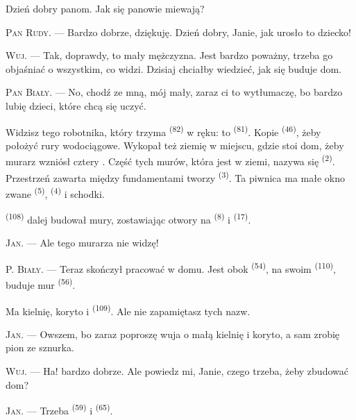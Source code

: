 Dzień dobry panom. Jak się panowie miewają?

\textsc{Pan Rudy}. --- Bardzo dobrze, dziękuję. Dzień dobry, Janie, jak urosło to
dziecko!

\textsc{Wuj}. --- Tak, doprawdy, to mały mężczyzna. Jest bardzo poważny, trzeba go
objaśniać o wszystkim, co widzi. Dzisiaj chciałby wiedzieć, jak się buduje dom.

\VUsaut{3.0mm}

\textsc{Pan Biały}. --- No, chodź ze mną, mój mały, zaraz ci to wytłumaczę, bo bardzo
lubię dzieci, które chcą się uczyć.

Widzisz tego robotnika, który trzyma  \textsuperscript{(82)} w ręku: to
 \textsuperscript{(81)}. Kopie  \textsuperscript{(46)}, żeby
położyć rury wodociągowe. Wykopał też ziemię w miejscu, gdzie stoi dom, żeby murarz
wzniósł cztery . Część tych murów, która jest w ziemi, nazywa się
 \textsuperscript{(2)}. Przestrzeń zawarta między fundamentami
tworzy  \textsuperscript{(3)}. Ta piwnica ma małe okno zwane
 \textsuperscript{(5)}, 
\textsuperscript{(4)} i schodki.

 \textsuperscript{(108)} dalej budował mury, zostawiając otwory na
 \textsuperscript{(8)} i  \textsuperscript{(17)}.

\textsc{Jan}. --- Ale tego murarza nie widzę!

P. \textsc{Biały}. --- Teraz skończył pracować w domu. Jest obok 
\textsuperscript{(54)}, na swoim  \textsuperscript{(110)}, buduje
mur  \textsuperscript{(56)}.

Ma kielnię, koryto i  \textsuperscript{(109)}. Ale nie zapamiętasz tych
nazw.

\textsc{Jan}. --- Owszem, bo zaraz poproszę wuja o małą kielnię i koryto, a sam zrobię
pion ze sznurka.

\VUsaut{3.0mm}
\VUsaut{3.0mm}

\textsc{Wuj}. --- Ha! bardzo dobrze. Ale powiedz mi, Janie, czego trzeba, żeby zbudować
dom?

\textsc{Jan}. --- Trzeba  \textsuperscript{(59)} i 
\textsuperscript{(65)}.

